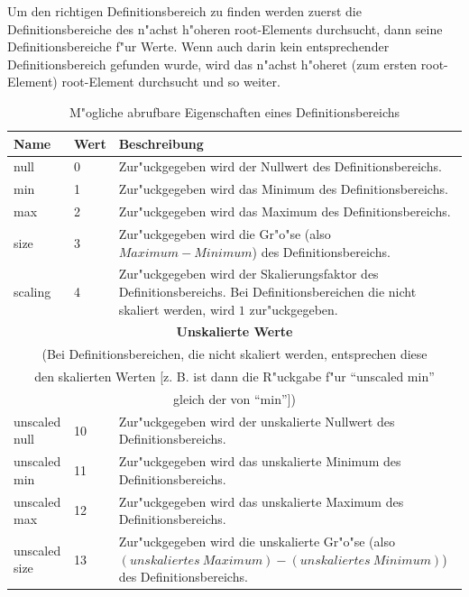 Um den richtigen Definitionsbereich zu finden werden zuerst die Definitionsbereiche des n"achst h"oheren root-Elements durchsucht, dann seine Definitionsbereiche f"ur Werte. Wenn auch darin kein entsprechender Definitionsbereich gefunden wurde, wird das n"achst h"oheret (zum ersten root-Element) root-Element durchsucht und so weiter.

\begin{table}[htbp]
\begin{center}
\begin{tabular}{|p{35mm}|p{10mm}|p{50mm}|}\hline
	Name & Wert & Beschreibung \\\hline\hline
	null & 0 & Zur"uckgegeben wird der Nullwert des Definitionsbereichs. \\\hline
	min & 1 & Zur"uckgegeben wird das Minimum des Definitionsbereichs. \\\hline
	max & 2 & Zur"uckgegeben wird das Maximum des Definitionsbereichs. \\\hline
	size & 3 & Zur"uckgegeben wird die Gr"o"se (also $Maximum-Minimum$) des Definitionsbereichs.\\\hline
	scaling & 4 & Zur"uckgegeben wird der Skalierungsfaktor des Definitionsbereichs. Bei Definitionsbereichen die nicht skaliert werden, wird $1$ zur"uckgegeben. \\\hline
	\multicolumn{3}{|c|}{\textbf{Unskalierte Werte}}\\
	\multicolumn{3}{|c|}{(Bei Definitionsbereichen, die nicht skaliert werden, entsprechen diese}\\
	\multicolumn{3}{|c|}{den skalierten Werten [z. B. ist dann die R"uckgabe f"ur ``unscaled min''}\\
	\multicolumn{3}{|c|}{gleich der von ``min''])}\\\hline
	unscaled null & 10 & Zur"uckgegeben wird der unskalierte Nullwert des Definitionsbereichs.\\\hline
	unscaled min & 11 & Zur"uckgegeben wird das unskalierte Minimum des Definitionsbereichs.\\\hline
	unscaled max & 12 & Zur"uckgegeben wird das unskalierte Maximum des Definitionsbereichs.\\\hline
	unscaled size & 13 & Zur"uckgegeben wird die unskalierte Gr"o"se (also $(unskaliertes\ Maximum)-(unskaliertes\ Minimum)$) des Definitionsbereichs. \\\hline
\end{tabular} 
\end{center}
\caption{M"ogliche abrufbare Eigenschaften eines Definitionsbereichs}
\label{tableDomainPropertyModes}
\end{table}

